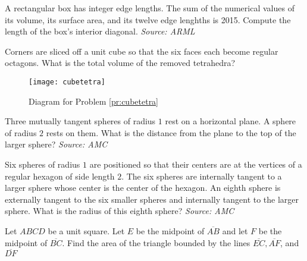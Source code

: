 \begin{problem}
A rectangular box has integer edge lengths. The sum of the numerical values of its volume, its surface area, and its twelve edge lenghths is 2015. Compute the length of the box's interior diagonal. \textit{Source: ARML}
\end{problem}

\begin{problem}
Corners are sliced off a unit cube so that the six faces each become regular octagons. What is the total volume of the removed tetrahedra?
\vspace{0.1in}
\begin{figure}[H]
    \centering
    \texttt{[image: cubetetra]}
    \caption{Diagram for Problem \ref{pr:cubetetra}}
\end{figure}
\label{pr:cubetetra}
\end{problem}

\begin{problem}
Three mutually tangent spheres of radius $1$ rest on a horizontal plane. A sphere of radius $2$ rests on them. What is the distance from the plane to the top of the larger sphere? \textit{Source: AMC}
\end{problem}

\begin{problem}
Six spheres of radius $1$ are positioned so that their centers are at the vertices of a regular hexagon of side length $2$. The six spheres are internally tangent to a larger sphere whose center is the center of the hexagon. An eighth sphere is externally tangent to the six smaller spheres and internally tangent to the larger sphere. What is the radius of this eighth sphere? \textit{Source: AMC}
\end{problem}

\begin{problem}
Let $ABCD$ be a unit square. Let $E$ be the midpoint of $\overline{AB}$ and let $F$ be the midpoint of $\overline{BC}$. Find the area of the triangle bounded by the lines $\overline{EC}, \overline{AF}$, and $\overline{DF}$
\end{problem}